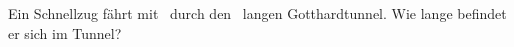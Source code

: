 Ein Schnellzug fährt mit \vZO\ durch den \sTO\ langen Gotthardtunnel. Wie lange befindet er sich im Tunnel?
